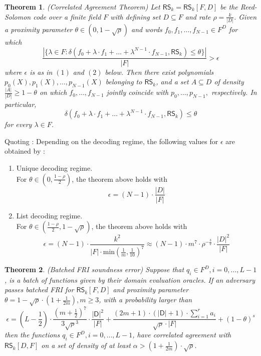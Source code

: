 \documentclass[10pt,letterpaper,titlepage]{article}
\newtheorem{theorem}{Theorem}
\theoremstyle{definition}
\begin{document}
\begin{appendices}
\begin{theorem}
  (Correlated Agreement Theorem) Let $\mathsf{RS}_k=\mathsf{RS}_k[F,D]$ be the Reed-Solomon code over a finite field $F$ with defining set $D\subseteq F$ and rate $\rho=\frac{k}{|D|}$. 
  Given a proximity parameter $\theta\in(0,1-\sqrt{\rho})$ and words $f_0,f_1,\ldots,f_{N-1}\in F^D$ for which 
  \[
    \frac{|\{\lambda\in F:\delta(f_0+\lambda\cdot f_1 +\ldots+\lambda^{N-1}\cdot f_{N-1},\mathsf{RS}_k)\leq\theta\}|}{|F|}>\epsilon
  \]
  where $\epsilon$ is as in $(1)$ and $(2)$ below. 
  Then there exist polynomials $p_0(X),p_1(X),\ldots,p_{N-1}(X)$ belonging to $\mathsf{RS}_k$, and a set $A\subseteq D$ of density $\frac{|A|}{|D|}\geq 1-\theta$ on which $f_0,\ldots,f_{N-1}$ jointly coincide with $p_0,\ldots,p_{N-1},$ respectively. In particular, 
  \[
    \delta(f_0+\lambda\cdot f_1 + \ldots + \lambda^{N-1}\cdot f_{N-1},\mathsf{RS}_k)\leq\theta
  \]
  for every $\lambda\in F$.
\end{theorem}
\noindent
Quoting \cite{FRIsummary}:
Depending on the decoding regime, the following values for $\epsilon$ are obtained by \cite{proxGaps}: 
\begin{enumerate}
  \item Unique decoding regime. \\
  For $\theta\in\left(0,\frac{1-\rho}{2}\right)$, the theorem above holds with 
  \[\epsilon = (N-1)\cdot\frac{|D|}{|F|}\]
  \item List decoding regime. \\
  For $\theta\in\left(\frac{1-\rho}{2},1-\sqrt{\rho}\right)$, the theorem above holds with 
  \[
    \epsilon=
    (N-1)\cdot
    \frac{k^2}{|F|\cdot\text{min}\left(\frac{1}{m},\frac{1}{10}\right)^7}\approx
    (N-1)\cdot 
    m^7\cdot
    \rho^{-\frac{3}{2}}\cdot
    \frac{|D|^2}{|F|}
  \]
\end{enumerate}
\begin{theorem}
  (Batched FRI soundness error) Suppose that $q_i\in F^D, i=0,\ldots,L-1$, is a batch of functions given by their domain evaluation oracles.
  If an adversary passes batched FRI for $\mathsf{RS}_k[F,D]$ and proximity parameter $\theta=1-\sqrt{\rho}\cdot(1+\frac{1}{2m}),m\geq3$, with a probability larger than 
  \[
    \epsilon=
    (L-\frac{1}{2})\cdot\frac{(m+\frac{1}{2})^7}{3\sqrt{\rho}^3}\cdot\frac{|\mathsf{D}|^2}{|F|} 
    + 
    \frac{(2m+1)\cdot(|\mathsf{D}|+1)\cdot\sum^r_{i=1}a_i}{\sqrt{\rho}\cdot|F|}
    +
    (1-\theta)^s
  \]
  then the functions $q_i\in F^D, i=0,\ldots,L-1$, have correlated agreement with $\mathsf{RS}_k[D,F]$ on a set of density of at least $\alpha>(1+\frac{1}{2m})\cdot\sqrt{\rho}$. 

\end{theorem}
\end{appendices}
\end{document}
